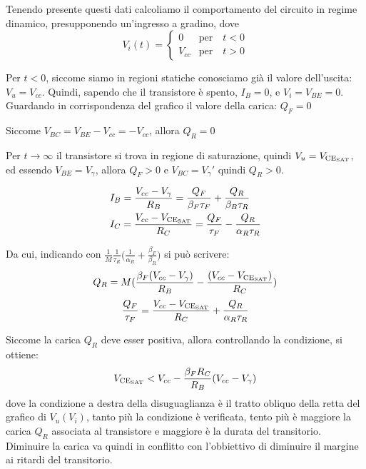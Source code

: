 \documentclass[../template]{subfiles}
\begin{document}
Tenendo presente questi dati calcoliamo il comportamento del circuito in regime dinamico, presupponendo un'ingresso a gradino, dove
\[
    V_i(t) =
    \begin{cases}
        0 & \text{per} \quad t < 0 \\
        V_{cc} & \text{per} \quad t > 0
    \end{cases}
\]
\begin{tcolorbox}
    Per $t < 0$, siccome siamo in regioni statiche conosciamo già il valore dell'uscita: $V_u = V_{cc}$.
    Quindi, sapendo che il transistore è spento, $I_B = 0$, e $V_i = V_{BE} = 0$.
    Guardando in corrispondenza del grafico il valore della carica: $Q_F = 0$

    Siccome $V_{BC} = V_{BE} - V_{cc} = -V_{cc}$, allora $Q_R = 0$
\end{tcolorbox}
\begin{tcolorbox}
    Per $t \to \infty$ il transistore si trova in regione di saturazione, quindi $V_u = V_{\text{CE}_{\text{SAT}}}$, ed essendo $V_{BE} = V_\gamma$, allora $Q_F > 0$ e $V_{BC} = V_\gamma'$ quindi $Q_R > 0$.

    \begin{align*}
        &I_B = \frac{V_{cc} - V_\gamma}{R_B} = \frac{Q_F}{\beta_F \tau_F} + \frac{Q_R}{\beta_B \tau_R}
        \\
        &I_C = \frac{V_{cc} - V_{\text{CE}_{\text{SAT}}}}{R_C} = \frac{Q_F}{\tau_F} - \frac{Q_R}{\alpha_R \tau_R}
    \end{align*}

    Da cui, indicando con $\frac{1}{M} \frac{1}{\tau_R} \big( \frac{1}{\alpha_R} + \frac{\beta_F}{\beta_R}\big)$ si può scrivere:
    \[
        Q_R = M (\frac{\beta_F(V_{cc} - V_\gamma)}{R_B} - \frac{(V_{cc} - V_{\text{CE}_{\text{SAT}}})}{R_C})
    \]
    \[
        \frac{Q_F}{\tau_F} = \frac{V_{cc} - V_{\text{CE}_{\text{SAT}}}}{R_C} + \frac{Q_R}{\alpha_R \tau_R}
    \]

    Siccome la carica $Q_R$ deve esser positiva, allora controllando la condizione, si ottiene:
    \[
        V_{\text{CE}_{\text{SAT}}} < V_{cc} - \frac{\beta_F R_C}{R_B} (V_{cc} - V_\gamma)
    \]
    dove la condizione a destra della disuguaglianza è il tratto obliquo della retta del grafico di $V_u(V_i)$, tanto più la condizione è verificata, tento più è maggiore la carica $Q_R$ associata al transistore e maggiore è la durata del transitorio.
    Diminuire la carica va quindi in conflitto con l'obbiettivo di diminuire il margine ai ritardi del transitorio.
\end{tcolorbox}
\end{document}

